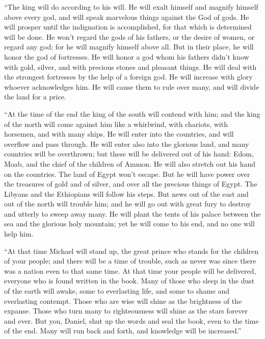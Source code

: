 \myverse{}“The king will do according to his will. He will exalt himself
and magnify himself above every god, and will speak marvelous things against the God of gods. He will
prosper until the indignation is accomplished, for that which is determined will be done.
\myverse{}He won’t regard the gods of his fathers, or the desire of women, or regard
any god; for he will magnify himself above all.
\myverse{}But in their place, he will honor the god of fortresses. He will honor a
god whom his fathers didn’t know with gold, silver, and with precious stones and pleasant things.
\myverse{}He will deal with the strongest fortresses by the help of a foreign god.
He will increase with glory whoever acknowledges him. He will cause them to rule over many, and will divide
the land for a price.

\myverse{}“At the time of the end the king of the south will contend with
him; and the king of the north will come against him like a whirlwind, with chariots, with horsemen, and
with many ships. He will enter into the countries, and will overflow and pass through.
\myverse{}He will enter also into the glorious land, and many countries will be overthrown;
but these will be delivered out of his hand: Edom, Moab, and the chief of the children of Ammon.
\myverse{}He will also stretch out his hand on the countries. The land of Egypt won’t
escape.
\myverse{}But he will have power over the treasures of gold and of silver, and over
all the precious things of Egypt. The Libyans and the Ethiopians will follow his steps.
\myverse{}But news out of the east and out of the north will trouble him; and he will
go out with great fury to destroy and utterly to sweep away many.
\myverse{}He will plant the tents of his palace between the sea and the glorious holy
mountain; yet he will come to his end, and no one will help him.


\mychapter{} \myverse*{}“At that time Michael will stand up, the great prince who stands
for the children of your people; and there will be a time of trouble, such as never was since there was
a nation even to that same time. At that time your people will be delivered, everyone who is found written
in the book.
\myverse{}Many of those who sleep in the dust of the earth will awake, some to everlasting
life, and some to shame and everlasting contempt.
\myverse{}Those who are wise will shine as the brightness of the expanse. Those who turn
many to righteousness will shine as the stars forever and ever.
\myverse{}But you, Daniel, shut up the words and seal the book, even to the time of the
end. Many will run back and forth, and knowledge will be increased.”

